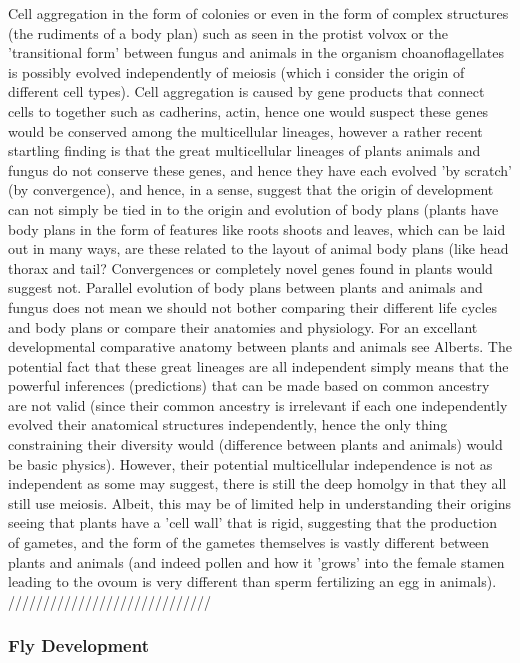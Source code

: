 Cell aggregation in the form of colonies or even in the form of complex structures (the rudiments of a body plan) such as seen in the protist volvox or the 'transitional form' between fungus and animals in the organism choanoflagellates is possibly evolved independently of meiosis (which i consider the origin of different cell types).  Cell aggregation is caused by gene products that connect cells to together such as cadherins, actin, hence one would suspect these genes would be conserved among the multicellular lineages, however a rather recent startling finding is that the great multicellular lineages of plants animals and fungus do not conserve these genes, and hence they have each evolved 'by scratch' (by convergence), and hence, in a sense, suggest that the origin of development can not simply be tied in to the origin and evolution of body plans (plants have body plans in the form of features like roots shoots and leaves, which can be laid out in many ways, are these related to the layout of animal body plans (like head thorax and tail?  Convergences or completely novel genes found in plants would suggest not. Parallel evolution of body plans between plants and animals and fungus does not mean we should not bother comparing their different life cycles and body plans or compare their anatomies and physiology.  For an excellant developmental comparative anatomy between plants and animals see Alberts.  The potential fact that these great lineages are all independent simply means that the powerful inferences (predictions) that can be made based on common ancestry are not valid (since their common ancestry is irrelevant if each one independently evolved their anatomical structures independently, hence the only thing constraining their diversity would (difference between plants and animals) would be basic physics).  However, their potential multicellular independence is not as independent as some may suggest, there is still the deep homolgy in that they all still use meiosis.  Albeit, this may be of limited help in understanding their origins seeing that plants have a 'cell wall' that is rigid, suggesting that the production of gametes, and the form of the gametes themselves is vastly different between plants and animals (and indeed pollen and how it 'grows' into the female stamen leading to the ovoum is very different than sperm fertilizing an egg in animals). 
/////////////////////////////
\subsubsection{Fly Development}


